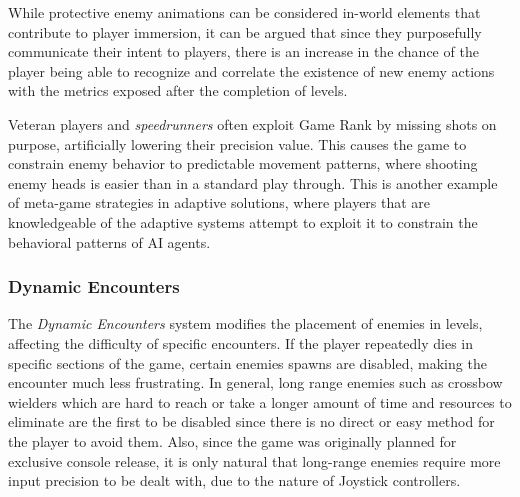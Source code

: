 While protective enemy animations can be considered in-world elements that contribute to player immersion, it can be argued that since they purposefully communicate their intent to players, there is an increase in the chance of the player being able to recognize and correlate the existence of new enemy actions with the metrics exposed after the completion of levels.

Veteran players and \emph{speedrunners} often exploit Game Rank by missing shots on purpose, artificially lowering their precision value. This causes the game to constrain enemy behavior to predictable movement patterns, where shooting enemy heads is easier than in a standard play through. This is another example of meta-game strategies in adaptive solutions, where players that are knowledgeable of the adaptive systems attempt to exploit it to constrain the behavioral patterns of AI agents.

\subsubsection{Dynamic Encounters}



The \emph{Dynamic Encounters} system modifies the placement of enemies in levels, affecting the difficulty of specific encounters. If the player repeatedly dies in specific sections of the game, certain enemies spawns are disabled, making the encounter much less frustrating. In general, long range enemies such as crossbow wielders which are hard to reach or take a longer amount of time and resources to eliminate are the first to be disabled since there is no direct or easy method for the player to avoid them. Also, since the game was originally planned for exclusive console release, it is only natural that long-range enemies require more input precision to be dealt with, due to the nature of Joystick controllers.

